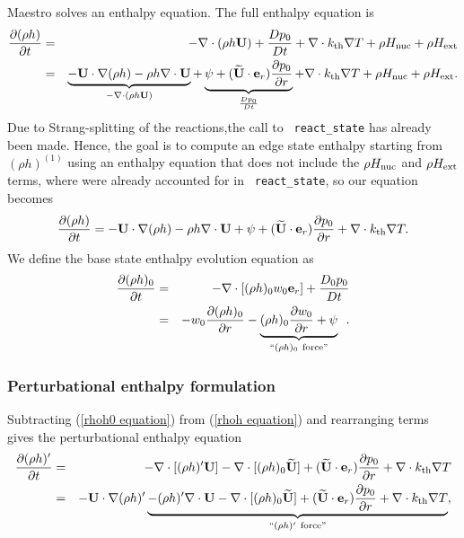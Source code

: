 Maestro solves an enthalpy equation.  
The full enthalpy equation is
\begin{eqnarray}
\frac{\partial(\rho h)}{\partial t} &=& -\nabla\cdot(\rho h {\bf U}) + \frac{Dp_0}{Dt} 
+ \nabla\cdot k_{\rm th} \nabla T + \rho H_{\rm nuc} + \rho H_{\rm ext} \nonumber \\
&=& \underbrace{-{\bf U}\cdot\nabla(\rho h) - \rho h\nabla\cdot{\bf U}}_{-\nabla\cdot(\rho h{\bf U})} 
+ \underbrace{\psi + (\widetilde{{\bf U}} \cdot \mathbf{e}_r) \frac{\partial p_0}{\partial r}}_{\frac{Dp_0}{Dt}} 
+ \nabla\cdot k_{\rm th}\nabla T + \rho H_{\rm nuc} + \rho H_{\rm ext}.
\end{eqnarray}
Due to Strang-splitting of the reactions,the call to {\tt
  react\_state} has already been made.  Hence, the goal is to compute
an edge state enthalpy starting from $(\rho h)^{(1)}$ using an
enthalpy equation that does not include the $\rho H_{\rm nuc}$ and
$\rho H_{\rm ext}$ terms, where were already accounted for in {\tt
  react\_state}, so our equation becomes
\begin{equation}
\frac{\partial(\rho h)}{\partial t} = -{\bf U}\cdot\nabla(\rho h) - \rho h\nabla\cdot{\bf U} 
+ \psi + (\widetilde{{\bf U}} \cdot \mathbf{e}_r) \frac{\partial p_0}{\partial r} + \nabla\cdot k_{\rm th}\nabla T. \label{rhoh equation}
\end{equation}
We define the base state enthalpy evolution equation as
\begin{eqnarray}
\frac{\partial(\rho h)_0}{\partial t} &=& -\nabla\cdot[(\rho h)_0 w_0{\bf e}_r] 
+ \frac{D_0p_0}{Dt} \nonumber \\
&=& -w_0\frac{\partial(\rho h)_0}{\partial r} 
- \underbrace{(\rho h)_0\frac{\partial w_0}{\partial r}+ \psi}_{``(\rho h)_0 ~ \text{force}"}
\enskip .\label{rhoh0 equation}
\end{eqnarray}

\subsubsection{Perturbational enthalpy formulation}

Subtracting (\ref{rhoh0 equation}) from (\ref{rhoh equation}) and
rearranging terms gives the perturbational enthalpy equation
\begin{eqnarray}
\frac{\partial(\rho h)'}{\partial t} &=& -\nabla\cdot[(\rho h)'{\bf U}] 
- \nabla\cdot[(\rho h)_0\widetilde{{\bf U}}] + (\widetilde{{\bf U}} \cdot \mathbf{e}_r)\frac{\partial p_0}{\partial r} 
+ \nabla\cdot k_{\rm th}\nabla T\nonumber \\
&=& -{\bf U}\cdot\nabla(\rho h)' \underbrace{- (\rho h)'\nabla\cdot{\bf U} 
- \nabla\cdot[(\rho h)_0\widetilde{{\bf U}}] + (\widetilde{{\bf U}} \cdot \mathbf{e}_r)\frac{\partial p_0}{\partial r}
+ \nabla\cdot k_{\rm th}\nabla T}_{``(\rho h)' ~ \text{force}"}, \label{rhohprime equation}
\end{eqnarray}

